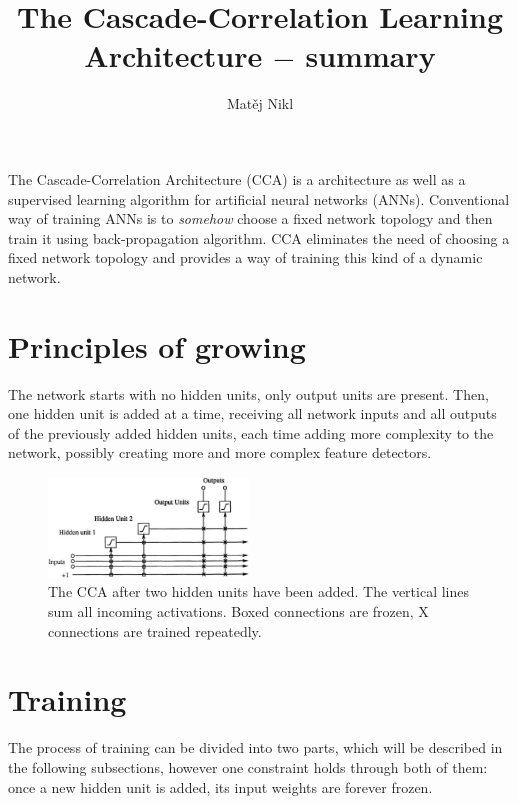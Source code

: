 \documentclass[a4paper,twocolumn]{article}
\title{The Cascade-Correlation Learning Architecture $-$ summary}
\author{Matěj Nikl}
\begin{document}
\maketitle
\noindent
The Cascade-Correlation Architecture (CCA) is a architecture as well as a supervised learning algorithm for artificial neural networks (ANNs). Conventional way of training ANNs is to \textit{somehow} choose a fixed network topology and then train it using back-propagation algorithm.
CCA eliminates the need of choosing a fixed network topology and provides a way of training this kind of a dynamic network.

\section{Principles of growing}
The network starts with no hidden units, only output units are present. Then, one hidden unit is added at a time, receiving all network inputs and all outputs of the previously added hidden units, each time adding more complexity to the network, possibly creating more and more complex feature detectors.

\begin{figure}[!h]
    \includegraphics[width=0.475\textwidth]{cascade.png}
    \caption{The CCA after two hidden units have been added. The vertical lines sum all incoming activations. Boxed connections are frozen, X connections are trained repeatedly.}
\end{figure}

\section{Training}
The process of training can be divided into two parts, which will be described in the following subsections, however one constraint holds through both of them: once a new hidden unit is added, its input weights are forever frozen.
\end{document}
